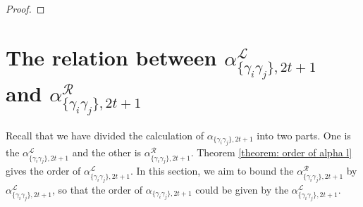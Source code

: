 \documentclass{article}
\newcommand{\ii}{\mathsf{i}}
\newcommand{\alpl}{\alpha_{\{\gamma_i\gamma_j\}, 2t+1}^{\mathscr{L}}}
\newcommand{\alpr}{\alpha_{\{\gamma_i\gamma_j\}, 2t+1}^{\mathscr{R}}}
\begin{document}
\begin{proof}



\end{proof}


\section{The relation between $\alpl$ and $\alpr$}
Recall that we have divided the calculation of $\alpha_{\{\gamma_i\gamma_j\}, 2t+1}$ into two parts. One is the $\alpl$ and the other is $\alpr$. Theorem \ref{theorem: order of alpha l} gives the order of $\alpl$. In this section, we aim to bound the $\alpr$ by $\alpl$, so that the order of $\alpha_{\{\gamma_i\gamma_j\}, 2t+1}$ could be given by the $\alpl$.
\end{document}
